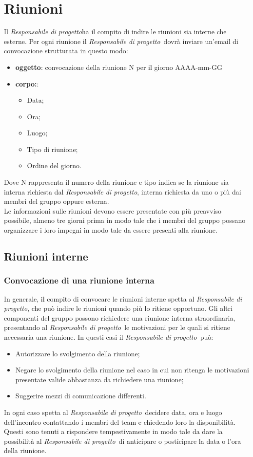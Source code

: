 \documentclass[float=false, crop=false]{standalone}
\newcommand{\responsabilediprogetto}{\textit{Responsabile di progetto}}
\begin{document}
	\section{Riunioni}
		Il \responsabilediprogetto ha il compito di indire le riunioni sia interne che esterne. Per ogni riunione il \responsabilediprogetto\ dovrà inviare un'email di convocazione strutturata in questo modo:
		\begin{itemize}
		\item \textbf{oggetto}: convocazione della riunione N per il giorno AAAA-mm-GG
		\item \textbf{corpo:}: 
		\begin{itemize}
		\item Data;
		\item Ora;
		\item Luogo;
		\item Tipo di riunione;
		\item Ordine del giorno.
		\end{itemize}
		\end{itemize}
		Dove N rappresenta il numero della riunione e tipo indica se la riunione sia interna richiesta dal \responsabilediprogetto, interna richiesta da uno o più dai membri del gruppo oppure esterna. \\
		Le informazioni sulle riunioni devono essere presentate con più preavviso possibile, almeno tre giorni prima in modo tale che i membri del gruppo possano organizzare i loro impegni in modo tale da essere presenti alla riunione.
		\subsection{Riunioni interne}
		\subsubsection{Convocazione di una riunione interna}
		In generale, il compito di convocare le riunioni interne spetta al \responsabilediprogetto, che può indire le riunioni quando più lo ritiene opportuno. Gli altri componenti del gruppo possono richiedere una riunione interna straordinaria, presentando al \responsabilediprogetto\ le motivazioni per le quali si ritiene necessaria una riunione. In questi casi il \responsabilediprogetto\ può:
		\begin{itemize}
		\item Autorizzare lo svolgimento della riunione;
		\item Negare lo svolgimento della riunione nel caso in cui non ritenga le motivazioni presentate valide abbastanza da richiedere una riunione;
		\item Suggerire mezzi di comunicazione differenti.
		\end{itemize}
		In ogni caso spetta al \responsabilediprogetto\ decidere data, ora e luogo dell'incontro contattando i membri del team e chiedendo loro la disponibilità. Questi sono tenuti a rispondere tempestivamente in modo tale da dare la possibilità al \responsabilediprogetto\ di anticipare o posticipare la data o l'ora della riunione.
\end{document}
